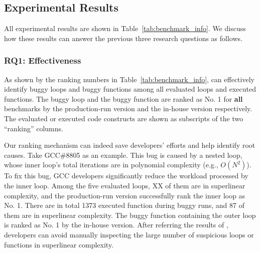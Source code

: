 \subsection{Experimental Results}
\label{sec:results}

All experimental results are shown in Table~\ref{tab:benchmark_info}.
We discuss how these results can answer 
the previous three research questions as follows.

\subsubsection{RQ1: Effectiveness}
As shown by the ranking numbers in Table~\ref{tab:benchmark_info},
\Tool can effectively identify buggy loops and buggy functions 
among all evaluated loops and executed functions.
The buggy loop and the buggy function are ranked as No. 1 for \textbf{all}
benchmarks by the production-run version and the in-house version respectively. 
 The evaluated or executed code constructs are shown as subscripts of 
the two ``ranking'' columns. 

Our ranking mechanism can indeed save developers' efforts 
and help identify root causes. 
Take GCC\#8805 as an example.
This bug is caused by a nested loop, 
whose inner loop's total iterations are in polynomial complexity (e.g., $O(N^2)$).
To fix this bug, GCC developers significantly reduce 
the workload processed by the inner loop. 
Among the five evaluated loops, {\color{red} XX} of them are in superlinear complexity, 
and the production-run version successfully rank the inner loop as No. 1.
There are in total 1373 executed function during buggy runs,
and 87 of them are in superlinear complexity. 
The buggy function containing the outer loop is ranked as No. 1 
by the in-house version. 
After referring the results of \Tool, 
developers can avoid manually inspecting the large number of  
suspicious loops or functions in superlinear complexity. 

